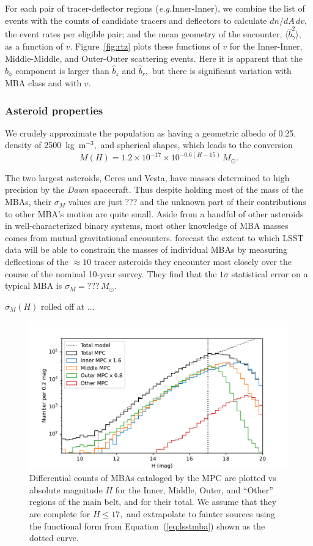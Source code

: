 \documentclass[linenumbers, onecolumn]{aastex631}
\newcommand{\eqq}[1]{Equation~(\ref{#1})}
\newcommand{\eg}{\textit{e.g.\/}}
\begin{document}
For each pair of tracer-deflector regions (\eg Inner-Inner), we combine the list of
events with the counts of candidate tracers and deflectors to
calculate $dn/dA\,dv,$ the event rates per eligible pair; and the mean
geometry of the encounter, $\langle \hat b^2_\gamma \rangle,$ as a
function of $v$.  Figure~\ref{fig:rtz} plots these functions of $v$
for the Inner-Inner, Middle-Middle, and Outer-Outer scattering
events.  Here it is apparent that the $\hat b_\phi$ component is
larger than $\hat b_z$ and $\hat b_r,$ but there is significant
variation with MBA class and with $v$.

\subsubsection{Asteroid properties}
We crudely approximate the population as having a geometric albedo of 0.25,
density of 2500~kg~m$^{-3},$ and spherical shapes, which leads to the
conversion
\begin{equation}
  M(H) = 1.2\times10^{-17} \times 10^{-0.6(H-15)}\, M_\odot.
\end{equation}

The two largest asteroids, Ceres and Vesta, have masses determined to
high precision by the \textit{Dawn} spacecraft.  Thus despite holding
most of the mass of the MBAs, their $\sigma_M$ values are just ??? and
the unknown part of their contributions to other MBA's motion are
quite small.  Aside from a handful of other asteroids in
well-characterized binary systems, most other knowledge of MBA masses
comes from mutual gravitational encounters.
\citet{negin} forecast the extent to which LSST data will be able to
constrain the masses of individual MBAs by measuring deflections of
the $\approx 10$ tracer asteroids they encounter most closely over the
course of the nominal 10-year survey.  They find that the $1\sigma$
statistical error on a typical MBA is $\sigma_M=???\, M_\odot.$

$\sigma_M(H)$ rolled off at ...

\begin{figure}
  \includegraphics{mbacounts.pdf}
  \caption{Differential counts of MBAs cataloged by the MPC are
    plotted vs absolute magnitude $H$  
    for the Inner, Middle, Outer, and ``Other'' regions of
    the main belt, and for their total.  We assume that they are
    complete for $H\le17,$ and extrapolate to fainter sources using
    the functional form from \eqq{eq:lsstmba} shown as the dotted
    curve.}
  \label{fig:counts}
\end{figure}
\end{document}
